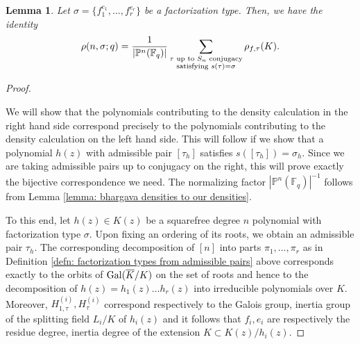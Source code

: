 \documentclass[10pt]{article}
\theoremstyle{plain}
\newtheorem{lemma}[theorem]{Lemma}
\theoremstyle{definition}
\numberwithin{equation}{section}
\begin{document}
\begin{lemma}\label{lemma: relation of bhargava conjecture to our theorem}
Let $\sigma = \{f_1^{e_1},\dots,f_r^{e_r}\}$ be a factorization type. Then, we have the identity
\[\rho(n,\sigma;q) = \frac{1}{|\mathbb P^n(\mathbb F_q)|}\sum_{\substack{\tau \text{ up to } S_n \text{ conjugacy}\\ \text{satisfying } s(\tau) = \sigma }}\rho_{f,\tau}(K).\]
\end{lemma}
\begin{proof}\label{pf: bhargava conjecture}

We will show that the polynomials contributing to the density calculation in the right hand side correspond precisely to the polynomials contributing to the density calculation on the left hand side. This will follow if we show that a polynomial $h(z)$ with admissible pair $[\tau_h]$ satisfies $s([\tau_h]) = \sigma_h$. Since we are taking admissible pairs up to conjugacy on the right, this will prove exactly the bijective correspondence we need. The normalizing factor $|\mathbb P^n(\mathbb F_q)|^{-1}$ follows from Lemma \ref{lemma: bhargava densities to our densities}.

To this end, let $h(z) \in K(z)$ be a squarefree degree $n$ polynomial with factorization type $\sigma$. Upon fixing an ordering of its roots, we obtain an admissible pair $\tau_h$. The corresponding decomposition of $[n]$ into parts $\pi_1,\dots,\pi_r$ as in Definition \ref{defn: factorization types from admissible pairs} above corresponds exactly to the orbits of $\operatorname{Gal}(\overline{K}/K)$ on the set of roots and hence to the decomposition of $h(z) = h_1(z)\dots h_r(z)$ into irreducible polynomials over $K$. Moreover, $H_{1,\tau}^{(i)}, H_{\tau}^{(i)}$ correspond respectively to the Galois group, inertia group of the splitting field $L_i/K$ of $h_i(z)$ and it follows that $f_i,e_i$  are respectively the residue degree, inertia degree of the extension $K \subset K(z)/h_i(z)$.

\end{proof}
\end{document}
